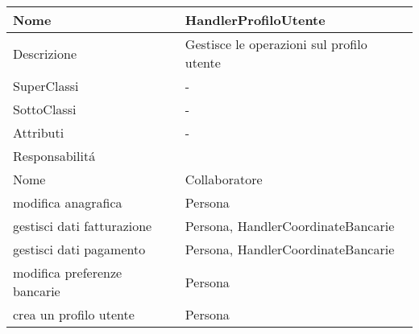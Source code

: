 \begin{center} %
    \begin{longtable}{ |p{3cm}|p{3cm}|p{3cm}|p{3cm}| }
        \hline
        Nome & \multicolumn{3}{|p{9cm}|}{HandlerProfiloUtente} \\\hline
        Descrizione & \multicolumn{3}{|p{9cm}|}{Gestisce le operazioni sul profilo utente} \\\hline
        SuperClassi & \multicolumn{3}{|p{9cm}|}{-} \\\hline
        SottoClassi & \multicolumn{3}{|p{9cm}|}{-} \\\hline
        Attributi & \multicolumn{3}{|p{9cm}|}{-} \\\hline
        \multicolumn{4}{|p{12cm}|}{Responsabilit\'a} \\\hline %
        \multicolumn{2}{|p{6cm}|}{Nome} & \multicolumn{2}{|p{6cm}|}{Collaboratore} \\\hline %
        \multicolumn{2}{|p{6cm}|}{modifica anagrafica} & \multicolumn{2}{|p{6cm}|}{Persona} \\\hline
        \multicolumn{2}{|p{6cm}|}{gestisci dati fatturazione} & \multicolumn{2}{|p{6cm}|}{Persona, HandlerCoordinateBancarie} \\\hline
        \multicolumn{2}{|p{6cm}|}{gestisci dati pagamento} & \multicolumn{2}{|p{6cm}|}{Persona, HandlerCoordinateBancarie} \\\hline
        \multicolumn{2}{|p{6cm}|}{modifica preferenze bancarie} & \multicolumn{2}{|p{6cm}|}{Persona} \\\hline
        \multicolumn{2}{|p{6cm}|}{crea un profilo utente} & \multicolumn{2}{|p{6cm}|}{Persona} \\\hline
    \end{longtable}
\end{center}

